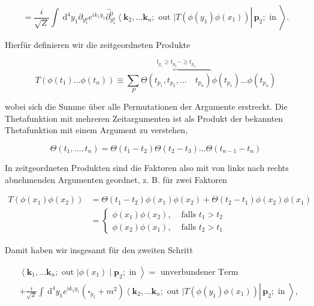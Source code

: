 \documentclass[10pt, letterpaper]{article}
\begin{document}
$$
\left.\left.=\frac{i}{\sqrt{Z}} \int \mathrm{~d}^{4} y_{1} \partial_{y_{1}^{0}} e^{i k_{1} y_{1}} \overleftrightarrow{\partial_{y_{1}^{0}}^{0}}\left\langle\mathbf{k}_{2}, \ldots \mathbf{k}_{n} ; \text { out }\right| T\left(\phi\left(y_{1}\right) \phi\left(x_{1}\right)\right) \right\rvert\, \mathbf{p}_{2} ; \text { in }\right\rangle .
$$

Hierfür definieren wir die zeitgeordneten Produkte

$$
T\left(\phi\left(t_{1}\right) \ldots \phi\left(t_{n}\right)\right) \equiv \sum_{P} \overbrace{\Theta\left(t_{p_{1}}, t_{p_{2}}, \ldots \quad t_{p_{n}}\right)}^{t_{p_{1}} \geqslant t_{p_{2}} \cdots \geqslant t_{p_{n}}} \phi\left(t_{p_{1}}\right) \ldots \phi\left(t_{p_{n}}\right)
$$

wobei sich die Summe über alle Permutationen der Argumente erstreckt. Die Thetafunktion mit mehreren Zeitargumenten ist als Produkt der bekannten Thetafunktion mit einem Argument zu verstehen,

$$
\Theta\left(t_{1}, \ldots, t_{n}\right)=\Theta\left(t_{1}-t_{2}\right) \Theta\left(t_{2}-t_{3}\right) \ldots \Theta\left(t_{n-1}-t_{n}\right)
$$

In zeitgeordneten Produkten sind die Faktoren also mit von links nach rechts abnehmenden Argumenten geordnet, z. B. für zwei Faktoren

$$
\begin{aligned}
T\left(\phi\left(x_{1}\right) \phi\left(x_{2}\right)\right) & =\Theta\left(t_{1}-t_{2}\right) \phi\left(x_{1}\right) \phi\left(x_{2}\right)+\Theta\left(t_{2}-t_{1}\right) \phi\left(x_{2}\right) \phi\left(x_{1}\right) \\
& = \begin{cases}\phi\left(x_{1}\right) \phi\left(x_{2}\right), & \text { falls } t_{1}>t_{2} \\
\phi\left(x_{2}\right) \phi\left(x_{1}\right), & \text { falls } t_{2}>t_{1}\end{cases}
\end{aligned}
$$

Damit haben wir insgesamt für den zweiten Schritt

$$
\begin{aligned}
& \left.\left\langle\mathbf{k}_{1}, \ldots \mathbf{k}_{n} ; \text { out }\right| \phi\left(x_{1}\right) \mid \mathbf{p}_{2} ; \text { in }\right\rangle=\text { unverbundener Term } \\
& \left.\left.+\frac{i}{\sqrt{Z}} \int \mathrm{~d}^{4} y_{1} e^{i k_{1} y_{1}}\left(\square_{y_{1}}+m^{2}\right)\left\langle\mathbf{k}_{2}, \ldots \mathbf{k}_{n} ; \text { out }\right| T\left(\phi\left(y_{1}\right) \phi\left(x_{1}\right)\right) \right\rvert\, \mathbf{p}_{2} ; \text { in }\right\rangle,
\end{aligned}
$$
\end{document}

